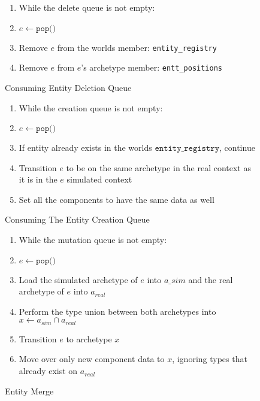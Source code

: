 \begin{figure}[htbp]
    \begin{enumerate}
        \item While the delete queue is not empty:
        \item $e \leftarrow \texttt{pop()}$
        \item Remove $e$ from the worlds member: \texttt{entity\_registry} 
        \item Remove $e$ from $e$'s archetype member: \texttt{entt\_positions} 
\end{enumerate}
\label{alg:entt_del_queue}
\caption{Consuming Entity Deletion Queue}
\end{figure}

\begin{figure}[htbp]
    \begin{enumerate}
        \item While the creation queue is not empty:
        \item $e \leftarrow \texttt{pop()}$
        \item If entity already exists in the worlds $\texttt{entity\_registry}$, continue
        \item Transition $e$ to be on the same archetype in the real context as it is in the $e$ simulated context
        \item Set all the components to have the same data as well
\end{enumerate}
\caption{Consuming The Entity Creation Queue}
\label{alg:entt_cre_queue}
\end{figure}

\begin{figure}[htbp]
\begin{enumerate}
    \item While the mutation queue is not empty:
    \item $e \leftarrow \texttt{pop()}$
    \item Load the simulated archetype of $e$ into $a\_{sim}$ and the real archetype of $e$ into $a_{real}$
    \item Perform the type union between both archetypes into $x \leftarrow a_{sim} \cap a_{real}$
    \item Transition $e$ to archetype $x$
    \item Move over only new component data to $x$, ignoring types that already exist on $a_{real}$
\end{enumerate}
\caption{Entity Merge}
\label{alg:entt_merge}
\end{figure}


